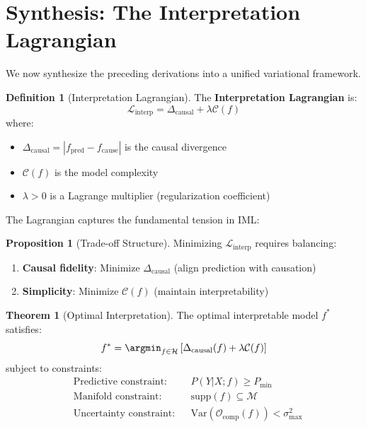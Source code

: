 \documentclass[11pt,a4paper]{article}
\theoremstyle{definition}
\newtheorem{definition}{Definition}[section]
\newtheorem{proposition}{Proposition}[section]
\newtheorem{theorem}{Theorem}[section]
\newcommand{\Var}{\mathrm{Var}}
\newcommand{\Ocomp}{\mathcal{O}_{\text{comp}}}
\newcommand{\Dcausal}{\Delta_{\text{causal}}}
\newcommand{\Complex}{\mathcal{C}}
\newcommand{\Manifold}{\mathcal{M}}
\begin{document}
\section{Synthesis: The Interpretation Lagrangian}
\label{sec:lagrangian}

We now synthesize the preceding derivations into a unified variational framework.

\begin{definition}[Interpretation Lagrangian]
The \textbf{Interpretation Lagrangian} is:
\begin{equation}
\boxed{\mathcal{L}_{\text{interp}} = \Dcausal + \lambda \Complex(f)}
\end{equation}
where:
\begin{itemize}    \item $\Dcausal = |f_{\text{pred}} - f_{\text{cause}}|$ is the causal divergence
    \item $\Complex(f)$ is the model complexity
    \item $\lambda > 0$ is a Lagrange multiplier (regularization coefficient)
\end{itemize}
\end{definition}

The Lagrangian captures the fundamental tension in IML:

\begin{proposition}[Trade-off Structure]
Minimizing $\mathcal{L}_{\text{interp}}$ requires balancing:
\begin{enumerate}    \item \textbf{Causal fidelity}: Minimize $\Dcausal$ (align prediction with causation)
    \item \textbf{Simplicity}: Minimize $\Complex(f)$ (maintain interpretability)
\end{enumerate}
\end{proposition}

\begin{theorem}[Optimal Interpretation]
The optimal interpretable model $f^*$ satisfies:
\begin{equation}
f^* = \argmin_{f \in \mathcal{H}} \left[ \Dcausal(f) + \lambda \Complex(f) \right]
\end{equation}
subject to constraints:
\begin{equation}
\begin{aligned}
&\text{Predictive constraint:} && P(Y|X; f) \geq P_{\min} \\
&\text{Manifold constraint:} && \text{supp}(f) \subseteq \Manifold \\
&\text{Uncertainty constraint:} && \Var(\Ocomp(f)) < \sigma^2_{\max}
\end{aligned}
\end{equation}
\end{theorem}
\end{document}

